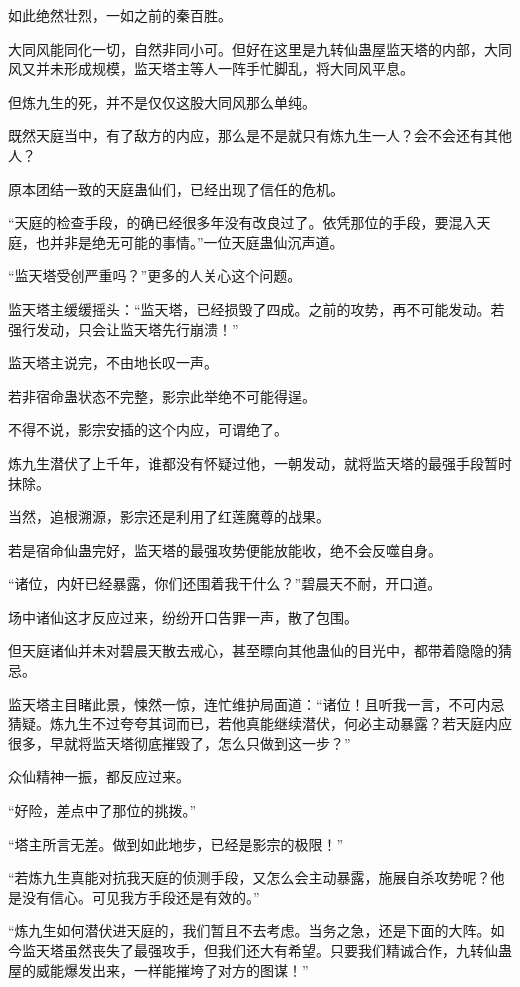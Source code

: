 \begin{this_body}
如此绝然壮烈，一如之前的秦百胜。

大同风能同化一切，自然非同小可。但好在这里是九转仙蛊屋监天塔的内部，大同风又并未形成规模，监天塔主等人一阵手忙脚乱，将大同风平息。

但炼九生的死，并不是仅仅这股大同风那么单纯。

既然天庭当中，有了敌方的内应，那么是不是就只有炼九生一人？会不会还有其他人？

原本团结一致的天庭蛊仙们，已经出现了信任的危机。

“天庭的检查手段，的确已经很多年没有改良过了。依凭那位的手段，要混入天庭，也并非是绝无可能的事情。”一位天庭蛊仙沉声道。

“监天塔受创严重吗？”更多的人关心这个问题。

监天塔主缓缓摇头：“监天塔，已经损毁了四成。之前的攻势，再不可能发动。若强行发动，只会让监天塔先行崩溃！”

监天塔主说完，不由地长叹一声。

若非宿命蛊状态不完整，影宗此举绝不可能得逞。

不得不说，影宗安插的这个内应，可谓绝了。

炼九生潜伏了上千年，谁都没有怀疑过他，一朝发动，就将监天塔的最强手段暂时抹除。

当然，追根溯源，影宗还是利用了红莲魔尊的战果。

若是宿命仙蛊完好，监天塔的最强攻势便能放能收，绝不会反噬自身。

“诸位，内奸已经暴露，你们还围着我干什么？”碧晨天不耐，开口道。

场中诸仙这才反应过来，纷纷开口告罪一声，散了包围。

但天庭诸仙并未对碧晨天散去戒心，甚至瞟向其他蛊仙的目光中，都带着隐隐的猜忌。

监天塔主目睹此景，悚然一惊，连忙维护局面道：“诸位！且听我一言，不可内忌猜疑。炼九生不过夸夸其词而已，若他真能继续潜伏，何必主动暴露？若天庭内应很多，早就将监天塔彻底摧毁了，怎么只做到这一步？”

众仙精神一振，都反应过来。

“好险，差点中了那位的挑拨。”

“塔主所言无差。做到如此地步，已经是影宗的极限！”

“若炼九生真能对抗我天庭的侦测手段，又怎么会主动暴露，施展自杀攻势呢？他是没有信心。可见我方手段还是有效的。”

“炼九生如何潜伏进天庭的，我们暂且不去考虑。当务之急，还是下面的大阵。如今监天塔虽然丧失了最强攻手，但我们还大有希望。只要我们精诚合作，九转仙蛊屋的威能爆发出来，一样能摧垮了对方的图谋！”


\end{this_body}
